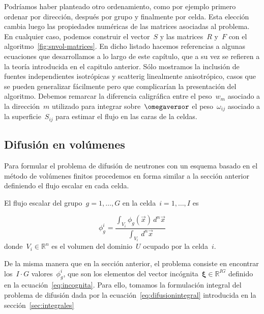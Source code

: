 Podríamos haber planteado otro ordenamiento, como por ejemplo primero ordenar por dirección, después por grupo y finalmente por celda. Esta elección cambia luego las propiedades numéricas de las matrices asociadas al problema. En cualquier caso, podemos construir el vector~$S$ y las matrices~$R$ y~$F$ con el algoritmo~\ref{fig:snvol-matrices}. En dicho listado hacemos referencias a algunas ecuaciones que desarrollamos a lo largo de este capítulo, que a su vez se refieren a la teoría introducida en el capitulo anterior. Sólo mostramos la inclusión de fuentes independientes isotrópicas y scatterig linealmente anisotrópico, casos que se pueden generalizar fácilmente pero que complicarían la presentación del algoritmo. Debemos remarcar la diferencia caligráfica entre el peso~$w_m$ asociado a la dirección~$m$ utilizado para integrar sobre~$\omegaversor$ el peso~$\omega_{ij}$ asociado a la superficie~$S_{ij}$ para estimar el flujo en las caras de la celdas.  





\subsection{Difusión en volúmenes} %

Para formular el problema de difusión de neutrones con un esquema basado en el método de volúmenes finitos procedemos en forma similar a la sección anterior definiendo el flujo escalar en cada celda.

\begin{definicion}\label{def:flujoescalarcelda}
El flujo escalar del grupo~$g=1,\dots,G$ en la celda~$i=1,\dots,I$ es

\begin{equation}
 \phi_{g}^i = \frac{\displaystyle \int_{V_i} \phi_{g}(\vec{x}) \, d^n\vec{x}}{\displaystyle \int_{V_i} \, d^n\vec{x}}
\end{equation}
%
donde~$V_i \in \mathbb{R}^n$ es el volumen del dominio~$U$ ocupado por la  celda~$i$.
\end{definicion}

De la misma manera que en la sección anterior, el problema consiste en encontrar los~$I \cdot G$ valores~$\phi_{g}^i$, que son los elementos del vector incógnita~$\boldsymbol{\xi} \in \mathbb{R}^{IG}$ definido en la ecuación~\eqref{eq:incognita}. Para ello, tomamos la formulación integral del problema de difusión dada por la ecuación~\eqref{eq:difusionintegral} introducida en la sección~\ref{sec:integrales}


